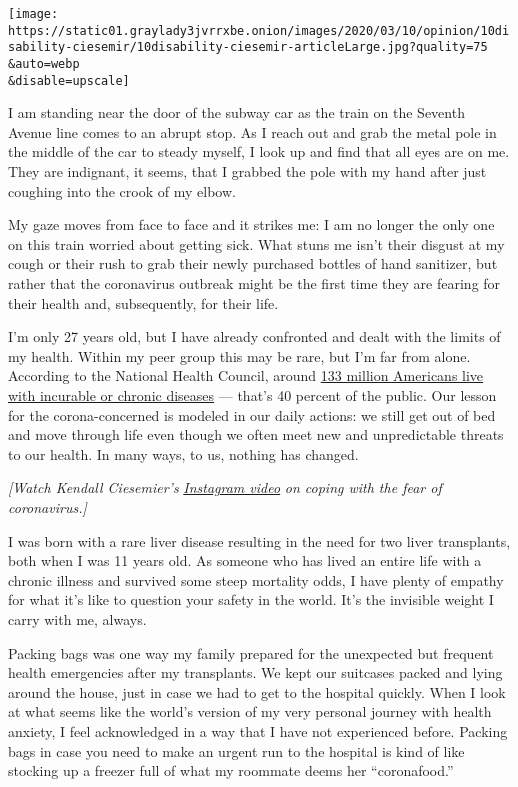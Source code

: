 \texttt{[image: https://static01.graylady3jvrrxbe.onion/images/2020/03/10/opinion/10disability-ciesemir/10disability-ciesemir-articleLarge.jpg?quality=75\\\&auto=webp\\\&disable=upscale]}

I am standing near the door of the subway car as the train on the
Seventh Avenue line comes to an abrupt stop. As I reach out and grab the
metal pole in the middle of the car to steady myself, I look up and find
that all eyes are on me. They are indignant, it seems, that I grabbed
the pole with my hand after just coughing into the crook of my elbow.

My gaze moves from face to face and it strikes me: I am no longer the
only one on this train worried about getting sick. What stuns me isn't
their disgust at my cough or their rush to grab their newly purchased
bottles of hand sanitizer, but rather that the coronavirus outbreak
might be the first time they are fearing for their health and,
subsequently, for their life.

I'm only 27 years old, but I have already confronted and dealt with the
limits of my health. Within my peer group this may be rare, but I'm far
from alone. According to the National Health Council, around
\href{https://nationalhealthcouncil.org/wp-content/uploads/2019/12/AboutChronicDisease.pdf}{133
million Americans live with incurable or chronic diseases} --- that's 40
percent of the public. Our lesson for the corona-concerned is modeled in
our daily actions: we still get out of bed and move through life even
though we often meet new and unpredictable threats to our health. In
many ways, to us, nothing has changed.

\emph{{[}Watch Kendall Ciesemier's}
\href{https://www.instagram.com/p/B9keeraBm_N/}{\emph{Instagram video}}
\emph{on coping with the fear of coronavirus.{]}}

I was born with a rare liver disease resulting in the need for two liver
transplants, both when I was 11 years old. As someone who has lived an
entire life with a chronic illness and survived some steep mortality
odds, I have plenty of empathy for what it's like to question your
safety in the world. It's the invisible weight I carry with me, always.

Packing bags was one way my family prepared for the unexpected but
frequent health emergencies after my transplants. We kept our suitcases
packed and lying around the house, just in case we had to get to the
hospital quickly. When I look at what seems like the world's version of
my very personal journey with health anxiety, I feel acknowledged in a
way that I have not experienced before. Packing bags in case you need to
make an urgent run to the hospital is kind of like stocking up a freezer
full of what my roommate deems her ``coronafood.''

